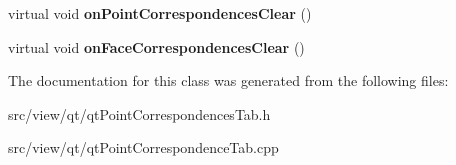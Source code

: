 \begin{DoxyCompactItemize}
\item 
\hypertarget{classqt_point_correspondences_tab_a45ce09045bb6c497f8b819e8929b3716}{}virtual void {\bfseries on\+Point\+Correspondences\+Clear} ()\label{classqt_point_correspondences_tab_a45ce09045bb6c497f8b819e8929b3716}

\item 
\hypertarget{classqt_point_correspondences_tab_a305e25d4b740d51af1a6d60c37bf8668}{}virtual void {\bfseries on\+Face\+Correspondences\+Clear} ()\label{classqt_point_correspondences_tab_a305e25d4b740d51af1a6d60c37bf8668}

\end{DoxyCompactItemize}


The documentation for this class was generated from the following files\+:\begin{DoxyCompactItemize}
\item 
src/view/qt/qt\+Point\+Correspondences\+Tab.\+h\item 
src/view/qt/qt\+Point\+Correspondence\+Tab.\+cpp\end{DoxyCompactItemize}
